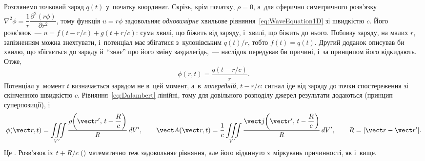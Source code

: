 Розглянемо точковий заряд $q(t)$ у~початку координат. Скрізь, крім початку, $\rho=0$, а~для сферично симетричного
розв'язку $\nabla^2\phi=\dfrac1r\dfrac{\partial^2(r\phi)}{\partial r^2}$, тому функція $u=r\phi$ задовольняє
\emph{одновимірне} хвильове рівняння~\eqref{eq:WaveEquation1D} зі швидкістю $c$. Його розв'язок~---
$u=f(t-r/c)+g(t+r/c)$: сума хвилі, що біжить від заряду, і~хвилі, що біжить до нього. Поблизу заряду, на малих
$r$, запізненням можна знехтувати, і~потенціал має збігатися з~кулонівським $q(t)/r$, тобто $f(t)=q(t)$.
Другий доданок описував би хвилю, що збігається до заряду й~\enquote{знає} про його зміну заздалегідь,~---
наслідок передував би причині, і~за принципом  його відкидають. Отже,
\begin{equation*}
	\phi(r,t)=\frac{q(t-r/c)}{r}.
\end{equation*}
Потенціал у~момент $t$ визначається зарядом не в~цей момент, а~в~\emph{попередній}, $t-r/c$: сигнал іде від заряду
до точки спостереження зі скінченною швидкістю $c$. Рівняння~\eqref{eq:Dalambert} лінійні, тому для довільного
розподілу джерел результати додаються (принцип суперпозиції), і~
\begin{equation}\label{eq:RetardedPotentials}
	\phi(\vect r,t)=\iiint\limits_{V'}\frac{\rho\!\left(\vect r',\,t-\dfrac Rc\right)}{R}\,dV',\qquad
	\vect A(\vect r,t)=\frac1c\iiint\limits_{V'}\frac{\vect j\!\left(\vect r',\,t-\dfrac Rc\right)}{R}\,dV',\qquad R=|\vect r-\vect r'|.
\end{equation}
Це . Розв'язок із~$t+R/c$ ()
математично теж задовольняє рівняння, але його відкинуто з~міркувань причинності, як і~вище.

